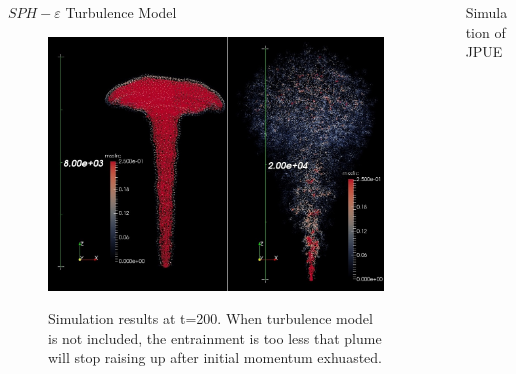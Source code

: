 \documentclass[final]{beamer}
\newlength{\sepwid}
\newlength{\onecolwid}
\newlength{\twocolwid}
\begin{document}
\begin{frame}[t]
\begin{columns}[t]
\begin{column}{\onecolwid}
\begin{block}{ $SPH-\varepsilon$ Turbulence Model \cite{monaghan2011turbulence}}
\begin{figure}
\centering
{\includegraphics[scale=0.85]{effect_of_turb_model}}
\caption{Simulation results at t=200. When turbulence model is not included, the entrainment is too less that plume will stop raising up after initial momentum exhuasted.}
\label{fig:effect_of_turbulence}
\end{figure}

\end{block}

\end{column} %


\begin{column}{\sepwid}\end{column} %

\begin{column}{\twocolwid} %

\begin{columns}[t,totalwidth=\twocolwid] %

\begin{column}{\onecolwid}\vspace{-1.4in} %

\begin{block}{Simulation of JPUE}


\end{block}
\end{column}
\end{columns}
\end{column}
\end{columns}
\end{frame}
\end{document}
